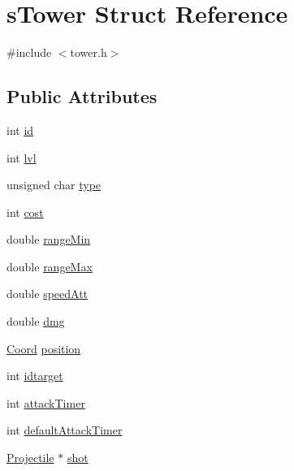 \hypertarget{structs_tower}{\section{s\-Tower Struct Reference}
\label{structs_tower}
}


{\ttfamily \#include $<$tower.\-h$>$}

\subsection*{Public Attributes}
\begin{DoxyCompactItemize}
\item 
int \hyperlink{structs_tower_ad7fbe8e544beaf6d2db2205bbdb99435}{id}
\item 
int \hyperlink{structs_tower_ac20e0db3500584704e60be50e8acf98f}{lvl}
\item 
unsigned char \hyperlink{structs_tower_a3891f13f52d26c0661d516777f847ff8}{type}
\item 
int \hyperlink{structs_tower_a5d829c98e70fa2b23f3dd5b88d88c011}{cost}
\item 
double \hyperlink{structs_tower_a337351f73af1fb962a111cd1b61df09b}{range\-Min}
\item 
double \hyperlink{structs_tower_a62624df1e766b331cd575fa4e2640bbc}{range\-Max}
\item 
double \hyperlink{structs_tower_aa5d34661ad01458c765a168ecd0e0a83}{speed\-Att}
\item 
double \hyperlink{structs_tower_a0c590cfdfbe22e0e65ca8e9c223df668}{dmg}
\item 
\hyperlink{coordonates_8h_aff9d4468ac7a973ce7e5cfb5bd39bc33}{Coord} \hyperlink{structs_tower_aaf5a4946b54c0dd20b83c494dcef2602}{position}
\item 
int \hyperlink{structs_tower_a3a2434471dec8e3a4d46cdd9aa635c79}{idtarget}
\item 
int \hyperlink{structs_tower_ae7011237193523458ecce3b90d200057}{attack\-Timer}
\item 
int \hyperlink{structs_tower_aaa900c24105d980a684815fa9d933ebd}{default\-Attack\-Timer}
\item 
\hyperlink{projectile_8h_a32e7d63dd0acece21597e95a3de34345}{Projectile} $\ast$ \hyperlink{structs_tower_a3c9d5ef0a9853b968919775398307a23}{shot}
\end{DoxyCompactItemize}


